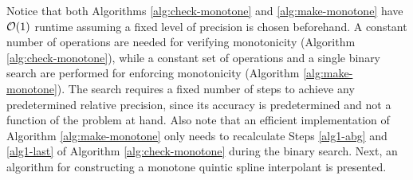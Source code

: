 Notice that both Algorithms \ref{alg:check-monotone} and \ref{alg:make-monotone} have ${\cal O}(1)$ runtime assuming a fixed level of precision is chosen beforehand. A constant number of operations are needed for verifying monotonicity (Algorithm \ref{alg:check-monotone}), while a constant set of operations and a single binary search are performed for enforcing monotonicity (Algorithm \ref{alg:make-monotone}). The search requires a fixed number of steps to achieve any predetermined relative precision, since its accuracy is predetermined and not a function of the problem at hand. Also note that an efficient implementation of Algorithm \ref{alg:make-monotone} only needs to recalculate Steps \ref{alg1-abg} and \ref{alg1-last} of Algorithm \ref{alg:check-monotone} during the binary search. Next, an algorithm for constructing a monotone quintic spline interpolant is presented.


